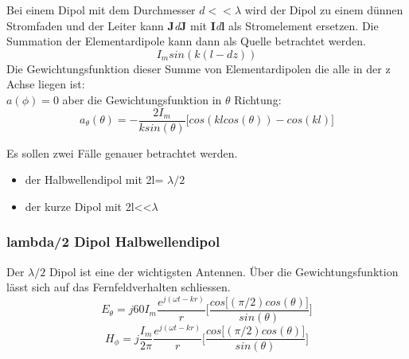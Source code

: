 Bei einem Dipol mit dem Durchmesser $d<<\lambda$ wird der Dipol zu einem dünnen Stromfaden und der Leiter kann \textbf{J}\textit{d}\textbf{\textbf{J}} mit \textbf{I}\textit{d}\textbf{\textbf{l}} als Stromelement ersetzen. Die Summation der Elementardipole kann dann als Quelle betrachtet werden.\\

\begin{equation}
I_{m}sin(k(l-dz))
\end{equation}
Die Gewichtungsfunktion dieser Summe von Elementardipolen die alle in der z Achse liegen ist:\\
$a(\phi)= 0$
aber die Gewichtungsfunktion in $\theta$ Richtung:
\begin{equation}
a_{\theta}(\theta)=- \frac{2I_{m}}{k sin(\theta)} \lbrack cos(kl cos(\theta)) - cos(kl) \rbrack
\end{equation}

Es sollen zwei Fälle genauer betrachtet werden.
\begin{itemize}
\item der Halbwellendipol mit 2l= $\lambda/2$
\item der kurze Dipol mit 2l<<$\lambda$
\end{itemize}
\subsubsection{lambda/2 Dipol  Halbwellendipol}
Der $\lambda/2$ Dipol ist eine der wichtigsten Antennen. Über die Gewichtungsfunktion lässt sich auf das Fernfeldverhalten schliessen.
\begin{equation}
E_{\theta}=j60I_{m} \frac{e^{j(\omega t - kr)}}{r} \lbrack \frac{cos\lbrack  (\pi/2) cos(\theta)\rbrack}{sin(\theta)} \rbrack
\end{equation}
\begin{equation}
H_{\phi}=j \frac{I_{m}}{2\pi} \frac{e^{j(\omega t - kr)}}{r} \lbrack \frac{cos\lbrack  (\pi/2) cos(\theta)\rbrack}{sin(\theta)} \rbrack
\end{equation}

